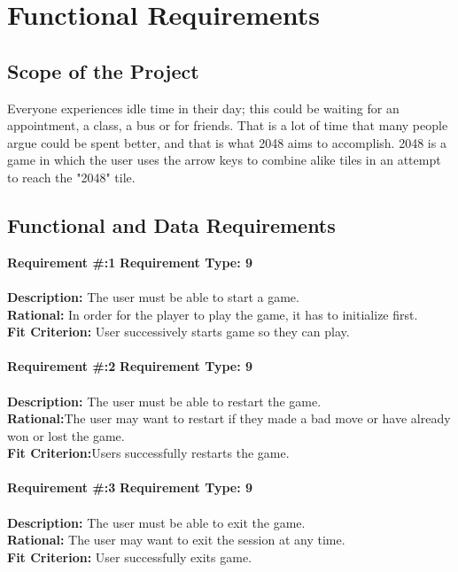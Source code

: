 \section{Functional Requirements}
\subsection{Scope of the Project}
Everyone experiences idle time in their day; this could be waiting for an 
appointment, a class, a bus or for friends. That is a lot of time that many 
people argue could be spent better, and that is what 2048 aims to accomplish. 
2048 is a game in which the user uses the arrow keys to combine alike tiles in 
an attempt to reach the "2048" tile.\\

\subsection{Functional and Data Requirements}
\textbf {Requirement \#:1} \indent\textbf {Requirement Type: 9}\\\\
\textbf {Description:} The user must be able to start a game.\\
\textbf {Rational:} In order for the player to play the game, it has to initialize first.\\
\textbf {Fit Criterion:} User successively starts game so they can play. \\\\

\textbf {Requirement \#:2} \indent\textbf {Requirement Type: 9} \\\\
\textbf {Description:} The user must be able to restart the game.\\
\textbf {Rational:}The user may want to restart if they made a bad move or have already won or lost the game. \\
\textbf {Fit Criterion:}Users successfully restarts the game. \\\\

\textbf {Requirement \#:3} \indent\textbf {Requirement Type: 9}\\\\
\textbf {Description:} The user must be able to exit the game.\\
\textbf {Rational:} The user may want to exit the session at any time.\\
\textbf {Fit Criterion:} User successfully exits game. \\\\

